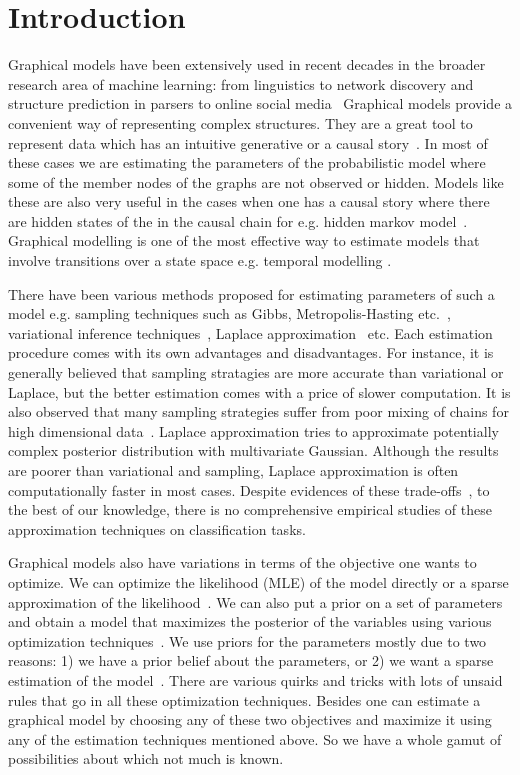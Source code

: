 \section{Introduction}

Graphical models have been extensively used in recent decades in the broader
research area of machine learning: from linguistics to network discovery and
structure prediction in parsers to online social
media~\cite{Koller+Friedman:09} Graphical models provide a convenient way of
representing complex structures.  They are a great tool to represent data
which has an intuitive generative or a causal story~\cite{GettingStarted}. In
most of these cases we are estimating the parameters of the probabilistic
model where some of the member nodes of the graphs are not observed or hidden.
Models like these are also very useful in the cases when one has a causal
story where there are hidden states of the in the causal chain for e.g. hidden
markov model~\cite{Baum1967}. Graphical modelling is one of the most effective
way to estimate models that involve transitions over a state space e.g.
temporal modelling \cite{Arnold:2007:TCM:1281192.1281203}. 

There have been various methods proposed for estimating parameters of such a
model e.g. sampling techniques such as Gibbs, Metropolis-Hasting
etc.~\cite{Robert:2005:MCS:1051451}, variational inference
techniques~\cite{citeulike:6420690}, Laplace
approximation~\cite{Azevedo-Filho:1994} etc. Each estimation procedure comes
with its own advantages and disadvantages. For instance, it is generally
believed that sampling stratagies are more accurate than variational or
Laplace, but the better estimation comes with a price of slower computation.
It is also observed that many sampling strategies suffer from poor mixing of
chains for high dimensional data~\cite{ShenACOSB10}. Laplace approximation
tries to approximate potentially complex posterior distribution with
multivariate Gaussian. Although the results are poorer than variational and
sampling, Laplace approximation is often computationally faster in most cases.
Despite evidences of these trade-offs~\cite{Asuncion2009smoothing,
medlda_MCMC12}, to the best of our knowledge, there is no comprehensive
empirical studies of these approximation techniques on classification tasks. 

Graphical models also have variations in terms of the objective one wants to
optimize. We can optimize the likelihood (MLE) of the model directly or a
sparse approximation of the likelihood~\cite{Banerjee:2008}. We can also put a
prior on a set of parameters and obtain a model that maximizes the posterior
of the variables using various optimization techniques~\cite{abs-0710-0013}.
We use priors for the parameters mostly due to two reasons: 1) we have a prior
belief about the parameters, or 2) we want a sparse estimation of the
model~\cite{Yoshida:2010}. There are various quirks and tricks with lots of
unsaid rules that go in all these optimization techniques. Besides one can
estimate a graphical model by choosing any of these two objectives and
maximize it using any of the estimation techniques mentioned above. So we have
a whole gamut of possibilities about which not much is known. 


